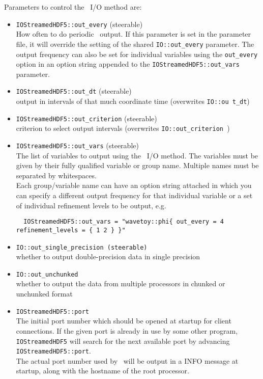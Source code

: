 \documentclass{article}
\begin{document}
Parameters to control the \ThisThorn\ I/O method are:
\begin{itemize}
  \item {\tt IOStreamedHDF5::out\_every} (steerable)\\
        How often to do periodic \ThisThorn\ output. If this parameter
        is set in the parameter file, it will override the setting of the shared
        {\tt IO::out\_every} parameter. The output frequency can also be set
        for individual variables using the {\tt out\_every} option in an option
        string appended to the {\tt IOStreamedHDF5::out\_vars} parameter.

  \item {\tt IOStreamedHDF5::out\_dt} (steerable)\\
        output in intervals of that much coordinate time (overwrites {\tt IO::ou
t\_dt})

  \item {\tt IOStreamedHDF5::out\_criterion} (steerable)\\
        criterion to select output intervals (overwrites {\tt IO::out\_criterion
})

  \item {\tt IOStreamedHDF5::out\_vars} (steerable)\\
        The list of variables to output using the \ThisThorn\ I/O method.
        The variables must be given by their fully qualified variable or group
        name. Multiple names must be separated by whitespaces.\\

        Each group/variable name can have an option string attached in which you
        can specify a different output frequency for that individual variable
        or a set of individual refinement levels to be output, e.g.
\begin{verbatim}
  IOStreamedHDF5::out_vars = "wavetoy::phi{ out_every = 4 refinement_levels = { 1 2 } }"
\end{verbatim}

  \item {\tt IO::out\_single\_precision (steerable)}\\
        whether to output double-precision data in single precision

  \item {\tt IO::out\_unchunked}\\
        whether to output the data from multiple processors in chunked or
        unchunked format

  \item {\tt IOStreamedHDF5::port}\\
        The initial port number which should be opened at startup for
        client connections. If the given port is already in use by some other
        program, {\tt IOStreamedHDF5} will search for the next available port
        by advancing {\tt IOStreamedHDF5::port}.\\
        The actual port number used by \ThisThorn\ will be output in a INFO
        message at startup, along with the hostname of the root processor.


\end{itemize}
\end{document}

